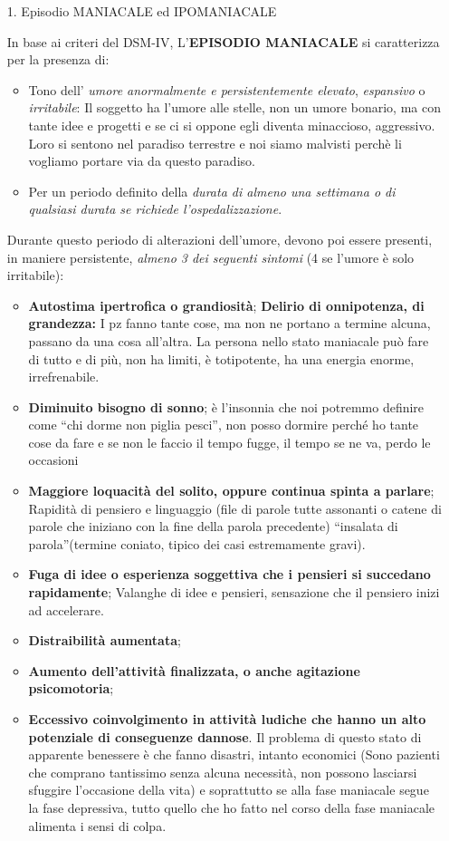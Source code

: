 \begin{itemize}
\item[1.] Episodio MANIACALE ed IPOMANIACALE

  In base ai criteri del DSM-IV, L'\textbf{EPISODIO MANIACALE} si
  caratterizza per la presenza di:
\begin{itemize}
\item
  Tono dell' \emph{umore anormalmente e persistentemente elevato},
  \emph{espansivo} o \emph{irritabile}: Il soggetto ha l'umore alle
  stelle, non un umore bonario, ma con tante idee e progetti e se ci si
  oppone egli diventa minaccioso, aggressivo. Loro si sentono nel
  paradiso terrestre e noi siamo malvisti perchè li vogliamo portare via
  da questo paradiso.
\item
  Per un periodo definito della \emph{durata di almeno una settimana o
  di qualsiasi durata se richiede l'ospedalizzazione}.
\end{itemize}

Durante questo periodo di alterazioni dell'umore, devono poi essere
presenti, in maniere persistente, \emph{almeno 3 dei seguenti sintomi}
(4 se l'umore è solo irritabile):

\begin{itemize}
\item
  \textbf{Autostima ipertrofica o grandiosità}; \textbf{Delirio di
  onnipotenza, di grandezza:} I pz fanno tante cose, ma non ne portano a
  termine alcuna, passano da una cosa all'altra. La persona nello stato
  maniacale può fare di tutto e di più, non ha limiti, è totipotente, ha
  una energia enorme, irrefrenabile.
\item
  \textbf{Diminuito bisogno di sonno}; è l'insonnia che noi potremmo
  definire come ``chi dorme non piglia pesci'', non posso dormire perché
  ho tante cose da fare e se non le faccio il tempo fugge, il tempo se
  ne va, perdo le occasioni
\item
  \textbf{Maggiore loquacità del solito, oppure continua spinta a
  parlare}; Rapidità di pensiero e linguaggio (file di parole tutte
  assonanti o catene di parole che iniziano con la fine della parola
  precedente) ``insalata di parola''(termine coniato, tipico dei casi
  estremamente gravi).
\item
  \textbf{Fuga di idee o esperienza soggettiva che i pensieri si
  succedano rapidamente}; Valanghe di idee e pensieri, sensazione che il
  pensiero inizi ad accelerare.
\item
  \textbf{Distraibilità aumentata};
\item
  \textbf{Aumento dell'attività finalizzata, o anche agitazione
  psicomotoria};
\item
  \textbf{Eccessivo coinvolgimento in attività ludiche che hanno un alto
  potenziale di conseguenze dannose}. Il problema di questo stato di
  apparente benessere è che fanno disastri, intanto economici (Sono
  pazienti che comprano tantissimo senza alcuna necessità, non possono
  lasciarsi sfuggire l'occasione della vita) e soprattutto se alla fase
  maniacale segue la fase depressiva, tutto quello che ho fatto nel
  corso della fase maniacale alimenta i sensi di colpa.
\end{itemize}


\end{itemize}
